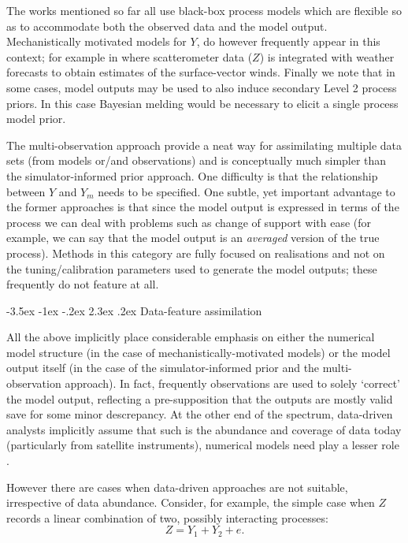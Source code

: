 \documentclass[10pt,a4paper]{article}
\makeatletter
\renewcommand\section{\@startsection{section}{1}{\z@}%
                                  {-3.5ex \@plus -1ex \@minus -.2ex}%
                                  {2.3ex \@plus.2ex}%
                                  {\normalfont\large\bfseries}}
\makeatother
\begin{document}
The works mentioned so far all use black-box process models which are flexible so as to accommodate both the observed data and the model output. Mechanistically motivated models for $Y$, do however frequently appear in this context; for example in \cite{Milliff_2011} where scatterometer data ($Z$) is integrated with weather forecasts to obtain estimates of the surface-vector winds. Finally we note that in some cases, model outputs may be used to also induce secondary Level 2 process priors. In this case Bayesian melding \citep{Poole_2000} would be necessary to elicit a single process model prior.  


The multi-observation approach provide a neat way for assimilating multiple data sets (from models or/and observations) and is conceptually much simpler than the simulator-informed prior approach. One difficulty is that the relationship between $Y$ and $Y_m$ needs to be specified. One subtle, yet important advantage to the former approaches is that since the model output is expressed in terms of the process we can deal with problems such as change of support \citep{Wikle_2005} with ease (for example, we can say that the model output is an \emph{averaged} version of the true process). Methods in this category are fully focused on realisations and not on the tuning/calibration parameters used to generate the model outputs; these frequently do not feature at all.  


\section{Data-feature assimilation}\label{sec:data-feature}

All the above implicitly place considerable emphasis on either the numerical model structure (in the  case of mechanistically-motivated models) or the model output itself (in the case of the simulator-informed prior and the multi-observation approach). In fact, frequently observations are used to solely `correct' the model output, reflecting a pre-supposition that the outputs are mostly valid save for some minor descrepancy. At the other end of the spectrum, data-driven analysts implicitly assume that such is the abundance and coverage of data today (particularly from satellite instruments), numerical models need play a lesser role \citep[see][for a suite for such methods in a spatial context]{Bradley_2014}. 

However there are cases when data-driven approaches are not suitable, irrespective of data abundance. Consider, for example, the simple case when $Z$ records a linear combination of two, possibly interacting processes:
\begin{equation}\label{eq:problem}
Z = Y_1 + Y_2 + e.
\end{equation}
\end{document}
